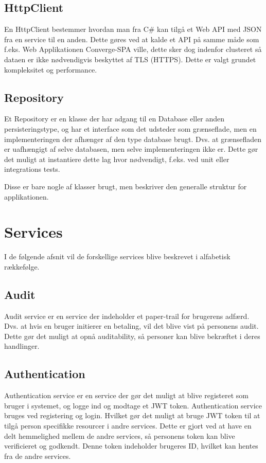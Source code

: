 \subsection{HttpClient}

En HttpClient bestemmer hvordan man fra C\# kan tilgå et Web API med JSON fra en service til en anden. Dette gøres ved at kalde et API på samme måde som f.eks. Web Applikationen Converge-SPA ville, dette sker dog indenfor clusteret så dataen er ikke nødvendigvis beskyttet af TLS (HTTPS). Dette er valgt grundet kompleksitet og performance.

\subsection{Repository}

Et Repository er en klasse der har adgang til en Database eller anden persisteringstype, og har et interface som det udsteder som grænseflade, men en implementeringen der afhænger af den type database brugt. Dvs. at grænsefladen er uafhængigt af selve databasen, men selve implementeringen ikke er. Dette gør det muligt at instantiere dette lag hvor nødvendigt, f.eks. ved unit eller integrations tests.


Disse er bare nogle af klasser brugt, men beskriver den generalle struktur for applikationen. 

\section{Services}

I de følgende afsnit vil de forskellige services blive beskrevet i alfabetisk rækkefølge.

\subsection{Audit}
\label{sec:audit-service}

Audit service er en service der indeholder et paper-trail for brugerens adfærd. Dvs. at hvis en bruger initierer en betaling, vil det blive vist på personens audit. Dette gør det muligt at opnå auditability, så personer kan blive bekræftet i deres handlinger.

\subsection{Authentication}
\label{sec:authentication-service}

Authentication service er en service der gør det muligt at blive registeret som bruger i systemet, og logge ind og modtage et JWT token. Authentication service bruges ved registering og login. Hvilket gør det muligt at bruge JWT token til at tilgå person specifikke resourcer i andre services. Dette er gjort ved at have en delt hemmelighed mellem de andre services, så personens token kan blive verificieret og godkendt. Denne token indeholder brugeres ID, hvilket kan hentes fra de andre services.

